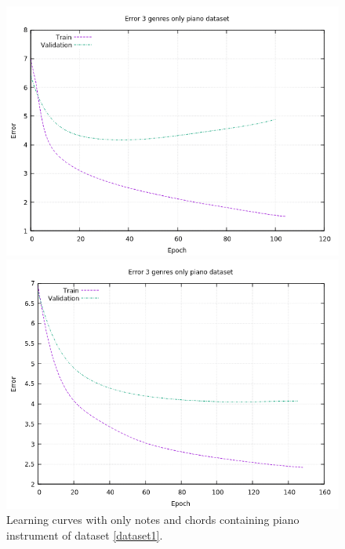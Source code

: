 \begin{figure}[H]
	\centering
	\begin{minipage}[t]{0.5\linewidth}
		\includegraphics[width=\linewidth]{img/Plot/piano/plot_piano_64_0_drop.png}
	\end{minipage}%
	\begin{minipage}[t]{0.5\linewidth}
		\includegraphics[width=\linewidth]{img/Plot/piano/plot_piano_64_0.1_drop.png}
	\end{minipage}
	\caption{Learning curves with only notes and chords containing piano instrument of dataset \ref{dataset1}.}
	\label{fig:piano}
\end{figure}
